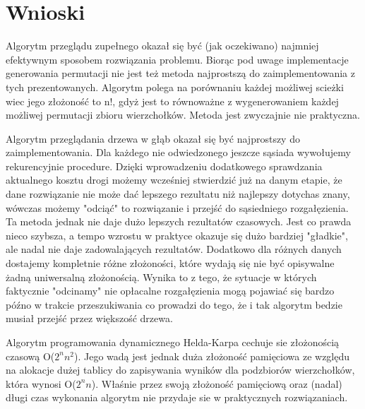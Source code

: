 \documentclass[polish,polish,a4paper]{article}
\begin{document}
\newpage

\section{Wnioski}
\hspace{\parindent}
\par
Algorytm przeglądu zupełnego okazał się być (jak oczekiwano) najmniej efektywnym sposobem rozwiązania problemu. Biorąc pod uwage implementacje generowania permutacji nie jest też
metoda najprostszą do zaimplementowania z tych prezentowanych. Algorytm polega na porównaniu każdej możliwej scieżki wiec jego złożoność to n!, gdyż jest to równoważne z wygenerowaniem
każdej możliwej permutacji zbioru wierzchołków. Metoda jest zwyczajnie nie praktyczna. \\

\par
Algorytm przeglądania drzewa w głąb okazał się być najprostszy do zaimplementowania. Dla każdego nie odwiedzonego jeszcze sąsiada wywołujemy rekurencyjnie procedure.
Dzięki wprowadzeniu dodatkowego sprawdzania aktualnego kosztu drogi możemy wcześniej stwierdzić już na danym etapie, że dane rozwiązanie nie może dać lepszego rezultatu niż najlepszy
dotychas znany, wówczas możemy "odciąć" to rozwiązanie i przejść do sąsiedniego rozgałęzienia. Ta metoda jednak nie daje dużo lepszych rezultatów czasowych. Jest co prawda nieco szybsza,
a tempo wzrostu w praktyce okazuje się dużo bardziej "gładkie", ale nadal nie daje zadowalających rezultatów. Dodatkowo dla różnych danych dostajemy kompletnie różne złożoności, które
wydają się nie być opisywalne żadną uniwersalną złożonością. Wynika to z tego, że sytuacje w których faktycznie "odcinamy" nie opłacalne rozgałęzienia mogą pojawiać się bardzo późno
w trakcie przeszukiwania co prowadzi do tego, że i tak algorytm bedzie musiał przejść przez większość drzewa. \\

\par
Algorytm programowania dynamicznego Helda-Karpa cechuje sie złożonością czasową O($2^nn^2$).
Jego wadą jest jednak duża złożoność pamięciowa ze względu na alokacje dużej tablicy do zapisywania wyników dla podzbiorów wierzchołków, która wynosi O($2^nn$).
Właśnie przez swoją złożoność pamięciową oraz (nadal) długi czas wykonania algorytm nie przydaje sie w praktycznych rozwiązaniach.



\end{document}
